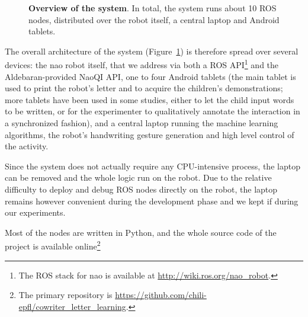 \documentclass{article}
\begin{document}
\begin{figure}[ht!]
{
}

\caption{\small \textbf{Overview of the system}. In total, the system runs about 10 ROS nodes,
    distributed over the robot itself, a central laptop and Android tablets.}

    \label{fig:archi}
\end{figure}

The overall architecture of the system (Figure~\ref{fig:archi}) is therefore
spread over several devices: the {\sc nao} robot itself, that we address via
both a ROS API\footnote{The ROS stack for {\sc nao} is available at
\url{http://wiki.ros.org/nao_robot}.} and the Aldebaran-provided NaoQI API, one
to four Android tablets (the main tablet is used to print the robot's letter and
to acquire the children's demonstrations; more tablets have been used in some
studies, either to let the child input words to be written, or for the
experimenter to qualitatively annotate the interaction in a synchronized
fashion), and a central laptop running the machine learning algorithms, the
robot's handwriting gesture generation and high level control of the activity.

Since the system does not actually require any CPU-intensive process, the laptop
can be removed and the whole logic run on the robot. Due to the relative
difficulty to deploy and debug ROS nodes directly on the robot, the laptop
remains however convenient during the development phase and we kept if during
our experiments.

Most of the nodes are written in Python, and the whole source code of the
project is available online\footnote{The primary repository is
\url{https://github.com/chili-epfl/cowriter_letter_learning}.}
\end{document}
